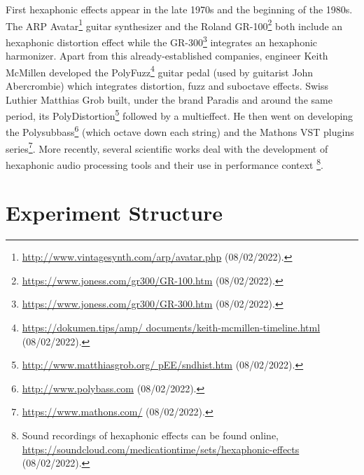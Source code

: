 \documentclass{article}
\begin{document}
First hexaphonic effects appear in the late 1970s and the beginning of the 1980s. The ARP Avatar\footnote{\url{http://www.vintagesynth.com/arp/avatar.php} (08/02/2022).} guitar synthesizer and the Roland GR-100\footnote{\url{https://www.joness.com/gr300/GR-100.htm} (08/02/2022).} both include an hexaphonic distortion effect while the GR-300\footnote{\url{https://www.joness.com/gr300/GR-300.htm} (08/02/2022).} integrates an hexaphonic harmonizer. Apart from this already-established companies, engineer Keith McMillen developed the PolyFuzz\footnote{\url{https://dokumen.tips/amp/
documents/keith-mcmillen-timeline.html} (08/02/2022).} guitar pedal (used by guitarist John Abercrombie) which integrates distortion, fuzz and suboctave effects. Swiss Luthier Matthias Grob built, under the brand Paradis and around the same period, its PolyDistortion\footnote{\url{http://www.matthiasgrob.org/
pEE/sndhist.htm} (08/02/2022).} followed by a multieffect. He then went on developing the Polysubbass\footnote{\url{http://www.polybass.com} (08/02/2022).} (which octave down each string) and the Mathons VST plugins series\footnote{\url{https://www.mathons.com/} (08/02/2022).}.
More recently, several scientific works deal with the development of hexaphonic audio processing tools \cite{sci:Puckette2007} and their use in performance context \cite{Reboursiere2020_Puzzle_eng,sci:Graham2012, Bates2009}\footnote{Sound recordings of hexaphonic effects can be found online, \url{https://soundcloud.com/medicationtime/sets/hexaphonic-effects} (08/02/2022).}.



\section{Experiment Structure}\label{sec:exp_structure}
\end{document}
